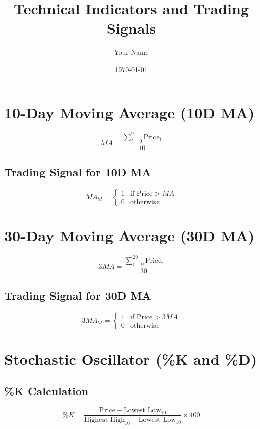 \documentclass{article}
\begin{document}
\title{Technical Indicators and Trading Signals}
\author{Your Name}
\date{\today}
\maketitle

\section{10-Day Moving Average (10D MA)}
\begin{equation}
MA = \frac{\sum_{i=0}^{9} \text{Price}_i}{10}
\end{equation}

\subsection{Trading Signal for 10D MA}
\begin{equation}
MA_{td} = 
\begin{cases} 
1 & \text{if Price} > MA \\
0 & \text{otherwise}
\end{cases}
\end{equation}

\section{30-Day Moving Average (30D MA)}
\begin{equation}
3MA = \frac{\sum_{i=0}^{29} \text{Price}_i}{30}
\end{equation}

\subsection{Trading Signal for 30D MA}
\begin{equation}
3MA_{td} = 
\begin{cases} 
1 & \text{if Price} > 3MA \\
0 & \text{otherwise}
\end{cases}
\end{equation}

\section{Stochastic Oscillator (\%K and \%D)}

\subsection{\%K Calculation}
\begin{equation}
\%K = \frac{\text{Price} - \text{Lowest Low}_{10}}{\text{Highest High}_{10} - \text{Lowest Low}_{10}} \times 100
\end{equation}
\end{document}
